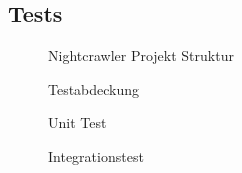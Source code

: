 \subsection{Tests}
\label{app:Test}
\begin{figure}[htb]
\centering
{}
\caption{Nightcrawler Projekt Struktur}
\end{figure}
\begin{figure}[htb]
\centering
{}
\caption{Testabdeckung}
\end{figure}
\begin{figure}[htb]
\centering
{}
\caption{Unit Test}
\end{figure}
\begin{figure}[htb]
\centering
{}
\caption{Integrationstest}
\end{figure}
\clearpage